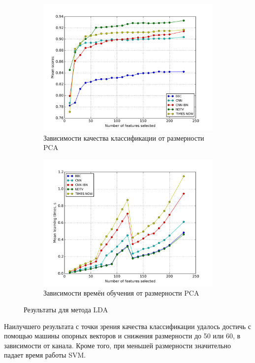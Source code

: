 \begin{figure}[h!]
    \centering
	\begin{subfigure}{0.45\textwidth}
		\includegraphics[width=\textwidth]{images/PCA-LDA.png}
		\caption{Зависимости качества классификации от размерности PCA}
	\end{subfigure}
	\begin{subfigure}{0.45\textwidth}
		\includegraphics[width=\textwidth]{images/PCA-LDATime.png}
		\caption{Зависимости времён обучения от размерности PCA}
	\end{subfigure}
	\caption{Результаты для метода LDA}\label{fig:lda_pca}
\end{figure}

\par
Наилучшего результата с точки зрения качества классификации удалось достичь с помощью машины опорных векторов и снижения размерности до 50 или 60, в зависимости от канала. Кроме того, при меньшей размерности значительно падает время работы SVM.

